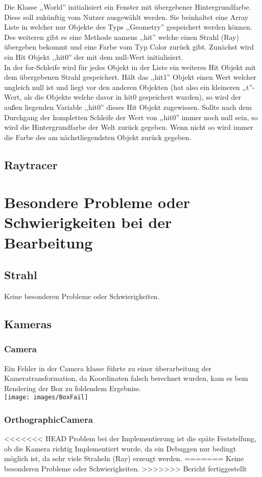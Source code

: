 \documentclass[14pt]{extarticle}
\begin{document}
Die Klasse ,,World'' initialisiert ein Fenster mit übergebener Hintergrundfarbe. Diese soll zukünftig vom Nutzer ausgewählt werden. Sie beinhaltet eine Array Liste in welcher nur Objekte des Typs ,,Geometry'' gespeichert werden können.\\ 
Des weiteren gibt es eine Methode namens ,,hit'' welche einen Strahl (Ray) übergeben bekommt und eine Farbe vom Typ Color zurück gibt. Zunächst wird ein Hit Objekt ,,hit0'' der mit dem null-Wert initialisiert. \\
In der for-Schleife wird für jedes Objekt in der Liste ein weiteres Hit Objekt mit dem übergebenen Strahl gespeichert. Hält das ,,hit1'' Objekt einen Wert welcher ungleich null ist und liegt vor den anderen Objekten (hat also ein kleineren ,,t''-Wert, als die Objekte welche davor in hit0 gespeichert wurden), so wird der außen liegenden Variable ,,hit0'' dieses Hit Objekt zugewiesen. Sollte nach dem Durchgang der kompletten Schleife der Wert von ,,hit0'' immer noch null sein, so wird die Hintergrundfarbe der Welt zurück gegeben. Wenn nicht so wird immer die Farbe des am nächstliegendsten Objekt zurück gegeben. 

\subsection{Raytracer}



\section{Besondere Probleme oder Schwierigkeiten bei der Bearbeitung}

\subsection{Strahl}
Keine besonderen Probleme oder Schwierigkeiten.
\subsection{Kameras}
\subsubsection{Camera}
Ein Fehler in der Camera klasse führte zu einer überarbeitung der Kameratransformation, da Koordinaten falsch berechnet wurden, kam es bem Rendering der Box zu foldendem Ergebniss.\\
\texttt{[image: images/BoxFail]}
\subsubsection{OrthographicCamera}
<<<<<<< HEAD
Problem bei der Implementierung ist die späte Feststellung, ob die Kamera richtig Implementiert wurde, da ein Debuggen nur bedingt möglich ist, da sehr viele Straheln (Ray) erzeugt werden.
=======
Keine besonderen Probleme oder Schwierigkeiten.
>>>>>>> Bericht fertiggestellt
\end{document}
